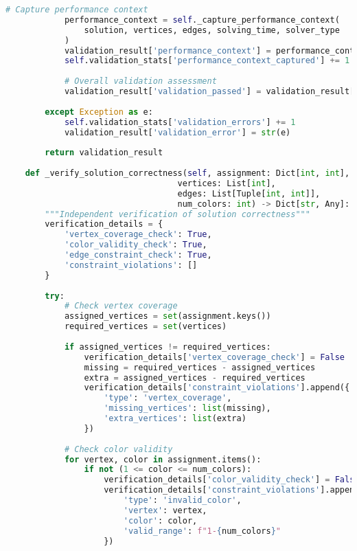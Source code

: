 \begin{lstlisting}[language=Python, caption=Independent Solution Validation with Trade-off Context]
            # Capture performance context
            performance_context = self._capture_performance_context(
                solution, vertices, edges, solving_time, solver_type
            )
            validation_result['performance_context'] = performance_context
            self.validation_stats['performance_context_captured'] += 1
            
            # Overall validation assessment
            validation_result['validation_passed'] = validation_result['correctness_verified']
            
        except Exception as e:
            self.validation_stats['validation_errors'] += 1
            validation_result['validation_error'] = str(e)
        
        return validation_result
    
    def _verify_solution_correctness(self, assignment: Dict[int, int], 
                                   vertices: List[int], 
                                   edges: List[Tuple[int, int]],
                                   num_colors: int) -> Dict[str, Any]:
        """Independent verification of solution correctness"""
        verification_details = {
            'vertex_coverage_check': True,
            'color_validity_check': True,
            'edge_constraint_check': True,
            'constraint_violations': []
        }
        
        try:
            # Check vertex coverage
            assigned_vertices = set(assignment.keys())
            required_vertices = set(vertices)
            
            if assigned_vertices != required_vertices:
                verification_details['vertex_coverage_check'] = False
                missing = required_vertices - assigned_vertices
                extra = assigned_vertices - required_vertices
                verification_details['constraint_violations'].append({
                    'type': 'vertex_coverage',
                    'missing_vertices': list(missing),
                    'extra_vertices': list(extra)
                })
            
            # Check color validity
            for vertex, color in assignment.items():
                if not (1 <= color <= num_colors):
                    verification_details['color_validity_check'] = False
                    verification_details['constraint_violations'].append({
                        'type': 'invalid_color',
                        'vertex': vertex,
                        'color': color,
                        'valid_range': f"1-{num_colors}"
                    })
            

\end{lstlisting}
